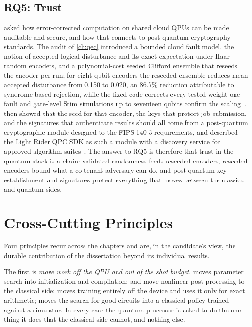 \subsection{RQ5: Trust}\label{sec:conclusion:rq5}

 asked how error-corrected computation on shared cloud QPUs can be made auditable and secure, and how that connects to post-quantum cryptography standards. The audit of \cref{ch:qec} introduced a bounded cloud fault model, the notion of accepted logical disturbance and its exact expectation under Haar-random encoders, and a polynomial-cost seeded Clifford ensemble that reseeds the encoder per run; for eight-qubit encoders the reseeded ensemble reduces mean accepted disturbance from 0.150 to 0.020, an 86.7\% reduction attributable to syndrome-based rejection, while the fixed  code corrects every tested weight-one fault and gate-level Stim simulations up to seventeen qubits confirm the scaling~\cite{guo2026qecaudit}.  then showed that the seed for that encoder, the keys that protect job submission, and the signatures that authenticate results should all come from a post-quantum cryptographic module designed to the FIPS 140-3 requirements, and described the Light Rider QPC SDK as such a module with a discovery service for approved algorithm suites~\cite{guo2026lightriderqpc}. The answer to RQ5 is therefore that trust in the quantum stack is a chain: validated randomness feeds reseeded encoders, reseeded encoders bound what a co-tenant adversary can do, and post-quantum key establishment and signatures protect everything that moves between the classical and quantum sides.

\section{Cross-Cutting Principles}\label{sec:conclusion:principles}

Four principles recur across the chapters and are, in the candidate's view, the durable contribution of the dissertation beyond its individual results.

The first is \emph{move work off the QPU and out of the shot budget}. \deal{} moves parameter search into initialization and compilation; \qawa{} and \vqt{} move nonlinear post-processing to the classical side; \nnqa{} moves training entirely off the device and uses it only for exact arithmetic; \rubriq{} moves the search for good circuits into a classical policy trained against a simulator. In every case the quantum processor is asked to do the one thing it does that the classical side cannot, and nothing else.

